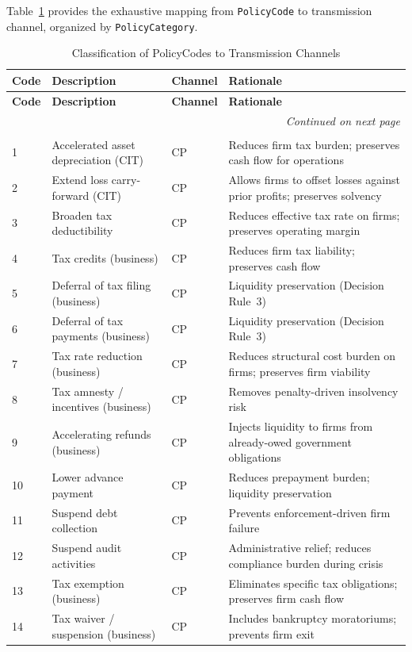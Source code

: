 \documentclass[12pt,a4paper]{article}
\begin{document}
Table~\ref{tab:mapping} provides the exhaustive mapping from \texttt{PolicyCode} to
transmission channel, organized by \texttt{PolicyCategory}.

\begin{small}
\begin{longtable}{p{0.6cm} p{5.8cm} p{1.2cm} p{5.5cm}}
\caption{Classification of PolicyCodes to Transmission Channels}
\label{tab:mapping} \\
\toprule
\textbf{Code} & \textbf{Description} & \textbf{Channel} & \textbf{Rationale} \\
\midrule
\endfirsthead
\toprule
\textbf{Code} & \textbf{Description} & \textbf{Channel} & \textbf{Rationale} \\
\midrule
\endhead
\midrule
\multicolumn{4}{r}{\textit{Continued on next page}} \\
\bottomrule
\endfoot
\bottomrule
\endlastfoot

\multicolumn{4}{l}{\textit{Category 1: Revenue Measures to Protect Businesses}} \\
\midrule
1  & Accelerated asset depreciation (CIT) & CP & Reduces firm tax burden; preserves cash flow for operations \\
2  & Extend loss carry-forward (CIT) & CP & Allows firms to offset losses against prior profits; preserves solvency \\
3  & Broaden tax deductibility & CP & Reduces effective tax rate on firms; preserves operating margin \\
4  & Tax credits (business) & CP & Reduces firm tax liability; preserves cash flow \\
5  & Deferral of tax filing (business) & CP & Liquidity preservation (Decision Rule~3) \\
6  & Deferral of tax payments (business) & CP & Liquidity preservation (Decision Rule~3) \\
7  & Tax rate reduction (business) & CP & Reduces structural cost burden on firms; preserves firm viability \\
8  & Tax amnesty / incentives (business) & CP & Removes penalty-driven insolvency risk \\
9  & Accelerating refunds (business) & CP & Injects liquidity to firms from already-owed government obligations \\
10 & Lower advance payment & CP & Reduces prepayment burden; liquidity preservation \\
11 & Suspend debt collection & CP & Prevents enforcement-driven firm failure \\
12 & Suspend audit activities & CP & Administrative relief; reduces compliance burden during crisis \\
13 & Tax exemption (business) & CP & Eliminates specific tax obligations; preserves firm cash flow \\
14 & Tax waiver / suspension (business) & CP & Includes bankruptcy moratoriums; prevents firm exit \\
\midrule


\end{longtable}
\end{small}
\end{document}
